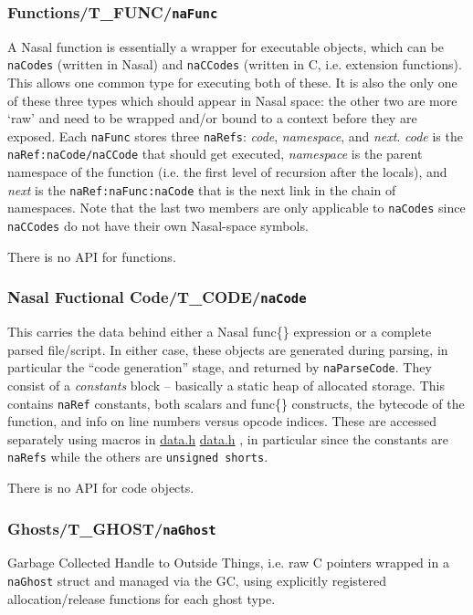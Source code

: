 \documentclass{article}
\newcommand{\todo}[1]{}
\newcommand{\name}[1]{{\it #1}}
\newcommand{\type}[1]{\textcolor{type}{\tt #1}}
\newcommand{\func}[1]{\textcolor{func}{\tt #1}}
\newcommand{\nasalsourcefile}[2][]{%
  \ifthenelse{\isempty{#1}}%
    {%
      \textcolor{source}{%
        \href{https://github.com/andyross/nasal/blob/master/src/#2}{#2}%
      }%
    }%
    {%
      \textcolor{source}{%
        \href{https://github.com/andyross/nasal/blob/master/src/#2\#L#1}{#2}%
      }%
    }%
}
\newcommand{\nasalkeyword}[1]{\textcolor{keyword}{#1}}
\begin{document}
\subsubsection{Functions/T\_FUNC/\type{naFunc}}
A Nasal function is essentially a wrapper for executable objects, which can be \type{naCodes} (written in Nasal) and \type{naCCodes} (written in C, i.e. extension functions).  This allows one common type for executing both of these.  It is also the only one of these three types which should appear in Nasal space: the other two are more `raw' and need to be wrapped and/or bound to a context before they are exposed.  Each \type{naFunc} stores three \type{naRefs}: \name{code}, \name{namespace}, and \name{next}.  \name{code} is the \type{naRef:naCode/naCCode} that should get executed, \name{namespace} is the parent namespace of the function (i.e. the first level of recursion after the locals), and \name{next} is the \type{naRef:naFunc:naCode} that is the next link in the chain of namespaces.  Note that the last two members are only applicable to \type{naCodes} since \type{naCCodes} do not have their own Nasal-space symbols.

There is no API for functions.

\subsubsection{Nasal Fuctional Code/T\_CODE/\type{naCode}}
This carries the data behind either a Nasal \nasalkeyword{func}\{\} expression or a complete parsed file/script.  In either case, these objects are generated during parsing, in particular the ``code generation'' stage, and returned by \func{naParseCode}.  They consist of a \name{constants} block -- basically a static heap of allocated storage.  This contains \type{naRef} constants, both scalars and \nasalkeyword{func}\{\} constructs, the bytecode of the function, and info on line numbers versus opcode indices.  These are accessed separately using macros in \nasalsourcefile{data.h}, in particular since the constants are \type{naRefs} while the others are \type{unsigned shorts}.

There is no API for code objects.

\subsubsection{Ghosts/T\_GHOST/\type{naGhost}}
\todo{document examples to be found in iolib.c}
Garbage Collected Handle to Outside Things, i.e. raw C pointers wrapped in a \type{naGhost} struct and  managed via the GC, using explicitly registered allocation/release functions for each ghost type.
\end{document}
